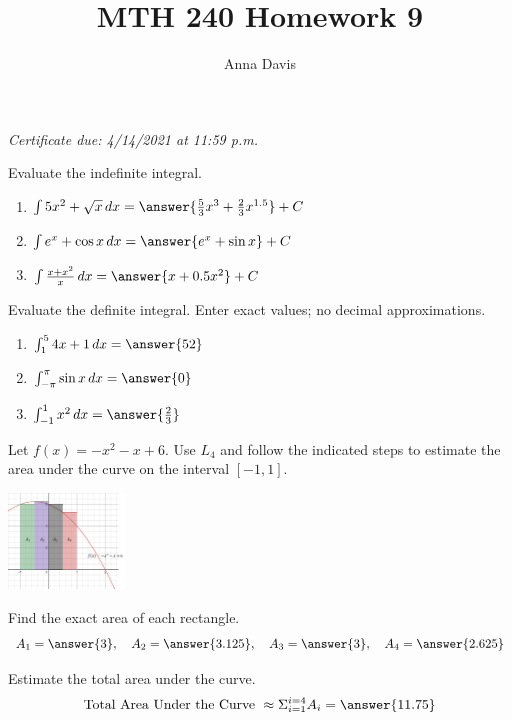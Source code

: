 \documentclass{ximera}
\author{Anna Davis} \title{MTH 240 Homework 9}
\begin{document}
\begin{abstract}

\end{abstract}
\maketitle
 \textit{Certificate due: 4/14/2021 at 11:59 p.m.}
 
\begin{problem}\label{prob:240HW9prob1}
Evaluate the indefinite integral.
  \begin{enumerate}
\item
$\int 5x^2+\sqrt{x}\,dx=\answer{\frac{5}{3}x^3+\frac{2}{3}x^{1.5}}+C$

\item
$\int e^x+\cos x\, dx=\answer{e^x+\sin x}+C$

\item
$\int \frac{x+x^2}{x}\,dx=\answer{x+0.5x^2}+C$
  \end{enumerate}
\end{problem}

\begin{problem}\label{prob:240HW9prob2}
Evaluate the definite integral.  Enter exact values; no decimal approximations.
  \begin{enumerate}
\item
$\int_1^5 4x+1\, dx=\answer{52}$

\item
$\int_{-\pi}^{\pi} \sin x\, dx=\answer{0}$

\item
$\int_{-1}^1 x^2\, dx=\answer{\frac{2}{3}}$

  \end{enumerate}
\end{problem}

\begin{problem}\label{prob:240HW9prob3}
Let $f(x)=-x^2-x+6$.  Use $L_4$ and follow the indicated steps to estimate the area under the curve on the interval $[-1,1]$.  
\begin{image}
   
\includegraphics[height=1in]{MTH240HW9pic1.jpg}

\end{image}
Find the exact area of each rectangle.
$$A_1=\answer{3},\quad A_2=\answer{3.125},\quad A_3=\answer{3},\quad A_4=\answer{2.625}$$

Estimate the total area under the curve.
$$\mbox{Total Area Under the Curve }\approx \Sigma_{i=1}^{i=4}A_i=\answer{11.75}$$
\end{problem}
\end{document}
